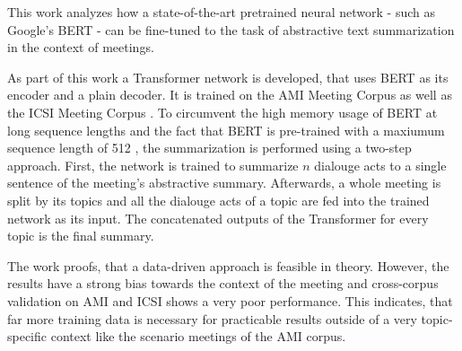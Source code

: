 This work analyzes how a state-of-the-art pretrained neural network - such as Google's BERT \cite{devlin2018bert} - can be fine-tuned to the task of abstractive text summarization in the context of meetings.

As part of this work a Transformer network \cite{1706.03762} is developed, that uses BERT as its encoder and a plain decoder.
It is trained on the AMI Meeting Corpus \cite{Mccowan05theami} as well as the ICSI Meeting Corpus \cite{Janin}.
To circumvent the high memory usage of BERT at long sequence lengths and the fact that BERT is pre-trained with a maxiumum sequence length of 512 \cite[p.~13]{devlin2018bert}, the summarization is performed using a two-step approach.
First, the network is trained to summarize \(n\) dialouge acts to a single sentence of the meeting's abstractive summary.
Afterwards, a whole meeting is split by its topics and all the dialouge acts of a topic are fed into the trained network as its input.
The concatenated outputs of the Transformer for every topic is the final summary.

The work proofs, that a data-driven approach is feasible in theory.
However, the results have a strong bias towards the context of the meeting and cross-corpus validation on AMI and ICSI shows a very poor performance.
This indicates, that far more training data is necessary for practicable results outside of a very topic-specific context like the scenario meetings of the AMI corpus. 